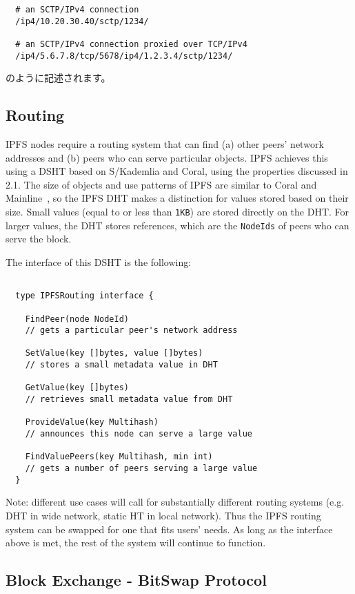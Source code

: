 \documentclass{sig-alternate}
\begin{document}
\begin{verbatim}
  # an SCTP/IPv4 connection
  /ip4/10.20.30.40/sctp/1234/

  # an SCTP/IPv4 connection proxied over TCP/IPv4
  /ip4/5.6.7.8/tcp/5678/ip4/1.2.3.4/sctp/1234/
\end{verbatim}

のように記述されます。

\subsection{Routing}

IPFS nodes require a routing system that can find (a) other peers' network addresses and (b) peers who can serve particular objects. IPFS achieves this using a DSHT based on S/Kademlia and Coral, using the properties discussed in 2.1. The size of objects and use patterns of IPFS are similar to Coral \cite{freedman04} and Mainline~\cite{wang13}, so the IPFS DHT makes a distinction for values stored based on their size. Small values (equal to or less than \texttt{1KB}) are stored directly on the DHT. For larger values, the DHT stores references, which are the \texttt{NodeIds} of peers who can serve the block.

The interface of this DSHT is the following:

\begin{verbatim}

  type IPFSRouting interface {

    FindPeer(node NodeId)
    // gets a particular peer's network address

    SetValue(key []bytes, value []bytes)
    // stores a small metadata value in DHT

    GetValue(key []bytes)
    // retrieves small metadata value from DHT

    ProvideValue(key Multihash)
    // announces this node can serve a large value

    FindValuePeers(key Multihash, min int)
    // gets a number of peers serving a large value
  }
\end{verbatim}

Note: different use cases will call for substantially different routing systems (e.g. DHT in wide network, static HT in local network). Thus the IPFS routing system can be swapped for one that fits users' needs. As long as the interface above is met, the rest of the system will continue to function.

\subsection{Block Exchange - BitSwap Protocol}
\end{document}
